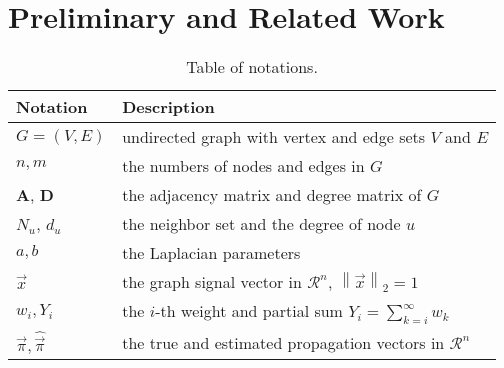 \section{Preliminary and Related Work} \label{sec:pre}




\begin{table} [t]
	\centering
	\renewcommand{\arraystretch}{1.3}
	\begin{small}
		\tblcapup
		\caption{Table of notations.}\label{tbl:def-notation}
		\vspace{-4mm}
		\begin{tabular} {|l|p{2.3in}|} \hline
			{\bf Notation} &  {\bf Description}  \\ \hline
			$G=(V,E)$ & undirected graph with vertex and   edge sets $V$ and $E$ \\ \hline
			$n, m$      &   the numbers of nodes and edges in $G$                            \\ \hline
			$\mathbf{A}$, $\mathbf{D}$  & the adjacency matrix and degree matrix of $G$\\ \hline
			$N_u$, $d_u$	& 	the neighbor set and the degree of node $u$\\ \hline
			$a,b$ & the Laplacian parameters\\ \hline
			$\vec{x}$ & the graph signal vector in $\mathcal{R}^n$, $\left\| \vec{x} \right\|_{2}=1$ \\ \hline
			$w_i, Y_i$ & the $i$-th weight  and partial sum $Y_i=\sum_{k=i}^\infty w_k$\\ \hline
			$\vec{\pi},\hat{\vec{\pi}}$ & the true and estimated propagation vectors in $\mathcal{R}^n$\\ \hline

\end{tabular}
\end{small}
\end{table}
